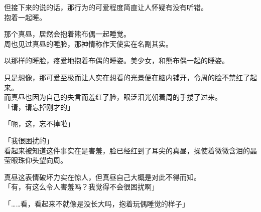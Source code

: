 但接下来的说的话，那行为的可爱程度简直让人怀疑有没有听错。\\

抱着一起睡。

那个真昼，居然会抱着熊布偶一起睡觉。\\

周也见过真昼的睡脸，那神情称作天使实在名副其实。

以那样的睡脸，疼爱地抱着布偶的睡姿。美少女，和熊布偶一起的睡姿。

只是想像，那可爱至极而让人实在想看的光景便在脑内铺开，令周的脸不禁红了起来。\\

而真昼也因为自己的失言而羞红了脸，眼泛泪光朝着周的手搂了过来。\\

「请，请忘掉刚才的」

「呃，这，忘不掉啦」

「我很困扰的」\\

看起来被知道这件事实在是害羞，脸已经红到了耳尖的真昼，操使着微微含泪的晶莹眼珠仰头望向周。

真昼这表情破坏力实在惊人，但真昼自己大概是对此不得而知。\\

「有，有这么令人害羞吗？我觉得不会很困扰啊」

「……看，看起来不就像是没长大吗，抱着玩偶睡觉的样子」

